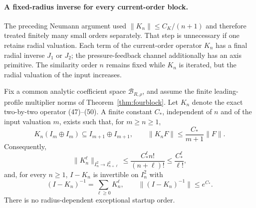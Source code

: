 \paragraph{A fixed-radius inverse for every current-order block.}
The preceding Neumann argument used $\|K_n\|\le C_K/(n+1)$ and therefore treated finitely many small orders separately. That step is unnecessary if one retains radial valuation. Each term of the current-order operator $K_n$ has a final radial inverse $J_1$ or $J_2$; the pressure-feedback channel additionally has an axis primitive. The similarity order $n$ remains fixed while $K_n$ is iterated, but the radial valuation of the input increases.

\begin{theorem}\label{thm:factorial-resolvent}
Fix a common analytic coefficient space $\mathcal B_{R,\rho}$, and assume the finite leading-profile multiplier norms of Theorem~\ref{thm:fourblock}. Let $K_n$ denote the exact two-by-two operator (47)--(50). A finite constant $C_*$, independent of $n$ and of the input valuation $m$, exists such that, for $m\ge n\ge1$,
\begin{equation}\label{eq:valuation-tame-K}
 K_n(I_m\oplus I_m)\subseteq I_{m+1}\oplus I_{m+1},
 \qquad\|K_nF\|\le\frac{C_*}{m+1}\|F\|.
\end{equation}
Consequently,
\begin{equation}\label{eq:factorial-K}
\|K_n^\ell\|_{I_n^2\to I_{n+\ell}^2}
\le\frac{C_*^\ell n!}{(n+\ell)!}
\le\frac{C_*^\ell}{\ell!},
\end{equation}
and, for every $n\ge1$, $I-K_n$ is invertible on $I_n^2$ with
\begin{equation}\label{eq:fixed-radius-inverse}
 (I-K_n)^{-1}=\sum_{\ell\ge0}K_n^\ell,
 \qquad\|(I-K_n)^{-1}\|\le e^{C_*}.
\end{equation}
There is no radius-dependent exceptional startup order.
\end{theorem}
